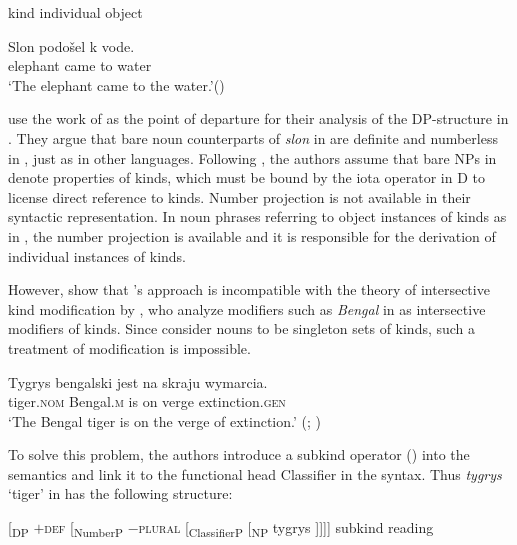 \documentclass[output=paper]{langscibook}
\begin{document}
\ea \label{ex:21}
\ea  {[\textsubscript{DP} D   [\textsubscript{NP} N]]}   \hfill kind \label{ex:21a}
 \hfill individual object \label{ex:21b}
\z \z

\ea \label{ex:22}
\gll Slon podošel k vode.\\
  elephant came to water\\
\glt `The elephant came to the water.'\hfill ()
\z

\noindent {} use the work of \citeauthor{Borik.Espinal2012} as the point of departure for their analysis of the DP-structure in . They argue that bare noun counterparts of \textit{slon} in  are definite and numberless in , just as in other languages. Following \citeauthor{Borik.Espinal2012}, the authors assume that bare NPs in  denote properties of kinds, which must be bound by the iota operator in D to license direct reference to kinds. Number projection is not available in their syntactic representation. In noun phrases referring to object instances of kinds as in , the number projection is available and it is responsible for the derivation of individual instances of kinds.

However, \citeauthor{Kwapiszewski.Fuellenbach2021} show that \citeauthor{Borik.Espinal2012}'s approach is incompatible with the theory of intersective kind modification by \citet{McNally.Boleda2004}, who analyze modifiers such as \textit{Bengal} in  as intersective modifiers of kinds. Since \citeauthor{Borik.Espinal2012} consider nouns to be singleton sets of kinds, such a treatment of modification is impossible.

\ea \label{ex:23}
\gll Tygrys bengalski jest na skraju wymarcia.\\
 tiger.\textsc{nom} Bengal.\textsc{m} is on verge extinction.\textsc{gen} \\
\glt `The Bengal tiger is on the verge of extinction.'
\glt \hfill (; )
\z

\noindent To solve this problem, the authors introduce a subkind operator () into the semantics and link it to the functional head Classifier in the syntax. Thus \textit{tygrys} `tiger' in  has the following structure:

\ea \label{ex:24} [\textsubscript{DP} \textsc{$+$def} [\textsubscript{NumberP} \textsc{$-$plural} [\textsubscript{ClassifierP}    [\textsubscript{NP} tygrys ]]]]   \hfill subkind reading
\z
\end{document}
